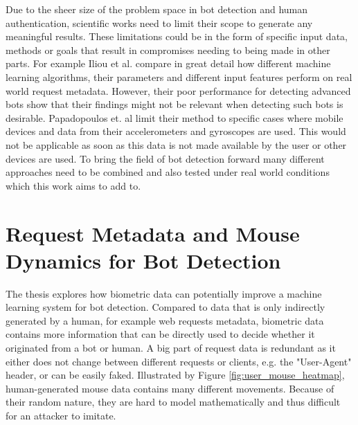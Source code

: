 \documentclass[
    fontsize=12pt,
    headings=small,
    parskip=half,           %
    bibliography=totoc,
    numbers=noenddot,       %
    open=any,               %
    final,                   %
    table
]{scrreprt}
\begin{document}
Due to the sheer size of the problem space in bot detection and human authentication, scientific works need to limit their scope to generate any meaningful results. These limitations could be in the form of specific input data, methods or goals that result in compromises needing to being made in other parts. For example Iliou et al. \cite{10.1145/3339252.3339267} compare in great detail how different machine learning algorithms, their parameters and different input features perform on real world request metadata. However, their poor performance for detecting advanced bots show that their findings might not be relevant when detecting such bots is desirable. Papadopoulos et. al \cite{PETS2021} limit their method to specific cases where mobile devices and data from their accelerometers and gyroscopes are used. This would not be applicable as soon as this data is not made available by the user or other devices are used. To bring the field of bot detection forward many different approaches need to be combined and also tested under real world conditions which this work aims to add to.


\label{sec:method_concept}
\chapter{Request Metadata and Mouse Dynamics for Bot Detection}

The thesis explores how biometric data can potentially improve a machine learning system for bot detection. Compared to data that is only indirectly generated by a human, for example web requests metadata, biometric data contains more information that can be directly used to decide whether it originated from a bot or human. A big part of request data is redundant as it either does not change between different requests or clients, e.g. the "User-Agent" header, or can be easily faked. Illustrated by Figure \ref{fig:user_mouse_heatmap}, human-generated mouse data contains many different movements. Because of their random nature, they are hard to model mathematically and thus difficult for an attacker to imitate.
\end{document}
